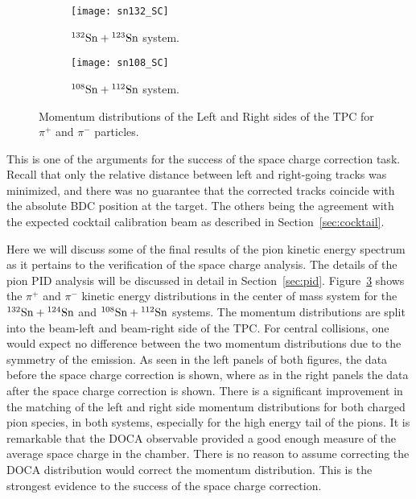 \begin{figure}[!htb]
    \centering
    \begin{subfigure}[t]{\textwidth}
        \centering
        \texttt{[image: sn132\_SC]} 
        \caption{${}^{132}\mathrm{Sn} + {}^{123}\mathrm{Sn}$ system.} \label{fig:132momdist_sc}
    \end{subfigure}
   
    \begin{subfigure}[t]{\textwidth}
        \centering
        \texttt{[image: sn108\_SC]} 
        \caption{${}^{108}\mathrm{Sn} + {}^{112}\mathrm{Sn}$ system.} \label{fig:108momdist_sc}
    \end{subfigure}
\caption{Momentum distributions of the Left and Right sides of the TPC for $\pi^+$ and $\pi^-$ particles.}
\label{fig:sc_momdist}
\end{figure}



This is one of the arguments for the success of the space charge correction task. Recall that only the relative distance between left and right-going tracks was minimized, and there was no guarantee that the corrected tracks coincide with the absolute BDC position at the target. The others being the agreement with the expected cocktail calibration beam as described in Section~\ref{sec:cocktail}.

Here we will discuss some of the final results of the pion kinetic energy spectrum as it pertains to the verification of the space charge analysis. The details of the pion PID analysis will be discussed in detail in Section~\ref{sec:pid}. Figure~\ref{fig:sc_momdist} shows the $\pi^+$ and $\pi^-$ kinetic energy distributions in the center of mass system for the ${}^{132}\mathrm{Sn} + {}^{124}\mathrm{Sn}$ and ${}^{108}\mathrm{Sn} + {}^{112}\mathrm{Sn}$ systems. The momentum distributions are split into the beam-left and beam-right side of the TPC. For central collisions, one would expect no difference between the two momentum distributions due to the symmetry of the emission. As seen in the left panels of both figures, the data before the space charge correction is shown, where as in the right panels the data after the space charge correction is shown. There is a significant improvement in the matching of the left and right side momentum distributions for both charged pion species, in both systems, especially for the high energy tail of the pions. It is remarkable that the DOCA observable provided a good enough measure of the average space charge in the chamber. There is no reason to assume correcting the DOCA distribution would correct the momentum distribution. This is the strongest evidence to the success of the space charge correction.



